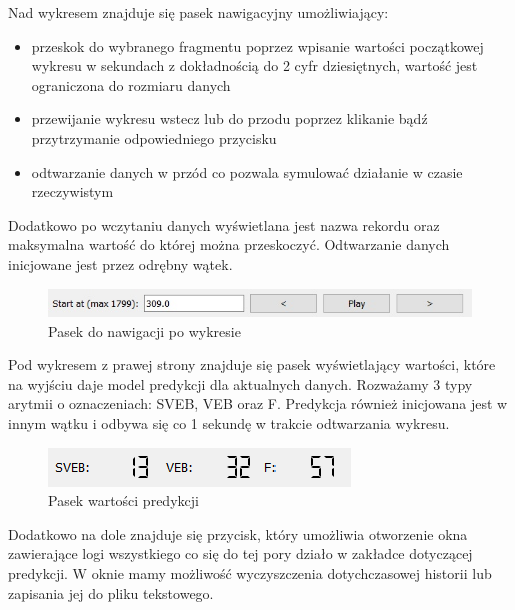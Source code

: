 \documentclass[polish,12pt]{aghthesis}
\begin{document}
Nad wykresem znajduje się pasek nawigacyjny umożliwiający:
\begin{itemize}
\item przeskok do wybranego fragmentu poprzez wpisanie wartości początkowej wykresu w sekundach z dokładnością do 2 cyfr dziesiętnych, wartość jest ograniczona do rozmiaru danych
\item przewijanie wykresu wstecz lub do przodu poprzez klikanie bądź przytrzymanie odpowiedniego przycisku
\item odtwarzanie danych w przód co pozwala symulować działanie w czasie rzeczywistym
\end{itemize}

Dodatkowo po wczytaniu danych wyświetlana jest nazwa rekordu oraz maksymalna wartość do której można przeskoczyć. Odtwarzanie danych inicjowane jest przez odrębny wątek.

\begin{figure}[h!]
	\centering
	\includegraphics[width=0.9\linewidth]{navigation.png}
	\caption{Pasek do nawigacji po wykresie}
	\label{fig:navigation}
\end{figure}

Pod wykresem z prawej strony znajduje się pasek wyświetlający wartości, które na wyjściu daje model predykcji dla aktualnych danych. Rozważamy 3 typy arytmii o oznaczeniach: SVEB, VEB oraz F.
Predykcja również inicjowana jest w innym wątku i odbywa się co 1 sekundę w trakcie odtwarzania wykresu.

\begin{figure}[H]
	\centering
	\includegraphics[width=0.5\linewidth]{output.png}
	\caption{Pasek wartości predykcji}
	\label{fig:output}
\end{figure}

Dodatkowo na dole znajduje się przycisk, który umożliwia otworzenie okna zawierające logi wszystkiego co się do tej pory działo w zakładce dotyczącej predykcji. W oknie mamy możliwość wyczyszczenia dotychczasowej historii lub zapisania jej do pliku tekstowego.
\end{document}

